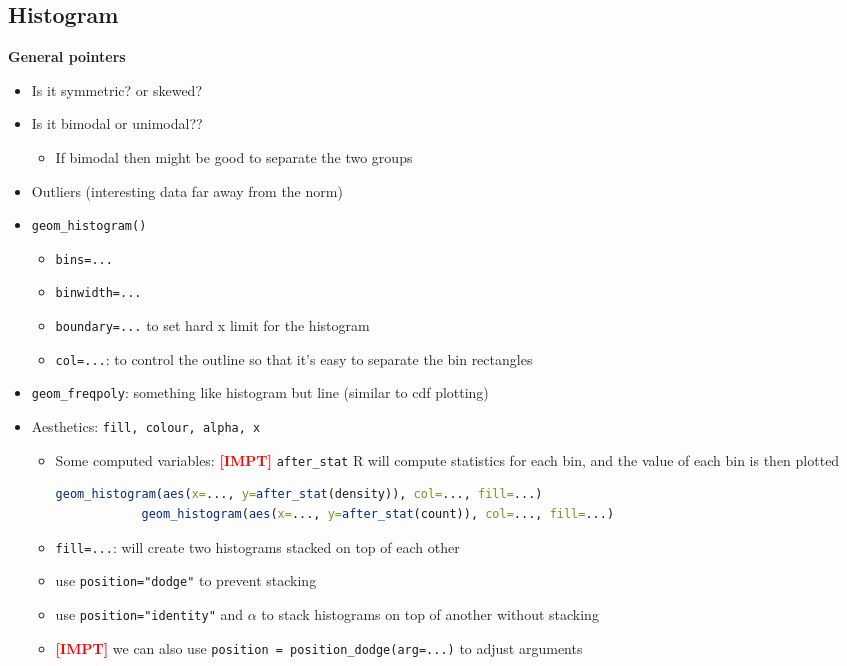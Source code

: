 \documentclass{article}
\newcommand{\impt}[0]{\textcolor{red}{\textbf{[IMPT] }}}
\begin{document}
\begin{multicols}{2}
\subsection{Histogram}
\textbf{General pointers}
\begin{itemize}
	\item Is it symmetric? or skewed?
	\item Is it bimodal or unimodal??
	\begin{itemize}
		\item If bimodal then might be good to separate the two groups
	\end{itemize}
    \item Outliers (interesting data far away from the norm)
\end{itemize}
\begin{itemize}
	\item \texttt{geom\_histogram()}
	\begin{itemize}
		\item \texttt{bins=...}
		\item \texttt{binwidth=...}
		\item \texttt{boundary=...} to set hard x limit for the histogram
		\item \texttt{col=...}: to control the outline so that it's easy to separate the bin rectangles
	\end{itemize}
	\item \texttt{geom\_freqpoly}: something like histogram but line (similar to cdf plotting)
	\item Aesthetics: \texttt{fill, colour, alpha, x}
	\begin{itemize}
		\item Some computed variables: \impt \texttt{after\_stat} R will compute statistics for each bin, and the value of each bin is then plotted
		\begin{lstlisting}[language=R]
			geom_histogram(aes(x=..., y=after_stat(density)), col=..., fill=...)
			geom_histogram(aes(x=..., y=after_stat(count)), col=..., fill=...)\end{lstlisting}
		\item \texttt{fill=...}: will create two histograms stacked on top of each other
		\item use \texttt{position="dodge"} to prevent stacking
		\item use \texttt{position="identity"} and $\alpha$ to stack histograms on top of another without stacking
		\item \impt we can also use \texttt{position = position\_dodge(arg=...)} to adjust arguments


\end{itemize}
\end{itemize}
\end{multicols}
\end{document}

